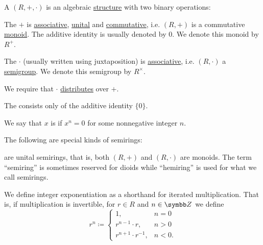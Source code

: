 \begin{definition}\label{def:semiring}
  A  \( (R, +, \cdot) \) is an algebraic \hyperref[def:algebraic_theory]{structure} with two binary operations:
  \begin{DefEnum}[series=def:semiring]
     The  \( + \) is \hyperref[def:algebraic_theory/associativity]{associative}, \hyperref[def:algebraic_theory/identity]{unital} and \hyperref[def:algebraic_theory/commutativity]{commutative}, i.e. \( (R, +) \) is a commutative \hyperref[def:magma/monoid]{monoid}. The additive identity is usually denoted by \( 0 \). We denote this monoid by \( R^+ \).

     The  \( \cdot \) (usually written using juxtaposition) is \hyperref[def:algebraic_theory/associativity]{associative}, i.e. \( (R, \cdot) \) a \hyperref[def:magma/semigroup]{semigroup}. We denote this semigroup by \( R^\times \).
  \end{DefEnum}

  We require that \( \cdot \) \hyperref[def:algebraic_theory/distributivity]{distributes} over \( + \).

  The  consists only of the additive identity \( \{ 0 \} \).

  We say that \( x \) is  if \( x^n = 0 \) for some nonnegative integer \( n \).

  The following are special kinds of semirings:
  \begin{DefEnum}[resume=def:semiring]
      are unital semirings, that is, both \( (R, +) \) and \( (R, \cdot) \) are monoids. The term \enquote{semiring} is sometimes reserved for dioids while \enquote{hemiring} is used for what we call semirings.

    We define integer exponentiation as a shorthand for iterated multiplication. That is, if multiplication is invertible, for \( r \in R \) and \( n \in \BZ \) we define
    \begin{equation*}
      r^n \coloneqq \begin{cases}
        1,                      & n = 0  \\
        r^{n - 1} \cdot r,      & n > 0  \\
        r^{n + 1} \cdot r^{-1}, & n < 0.
      \end{cases}
    \end{equation*}


\end{DefEnum}
\end{definition}
